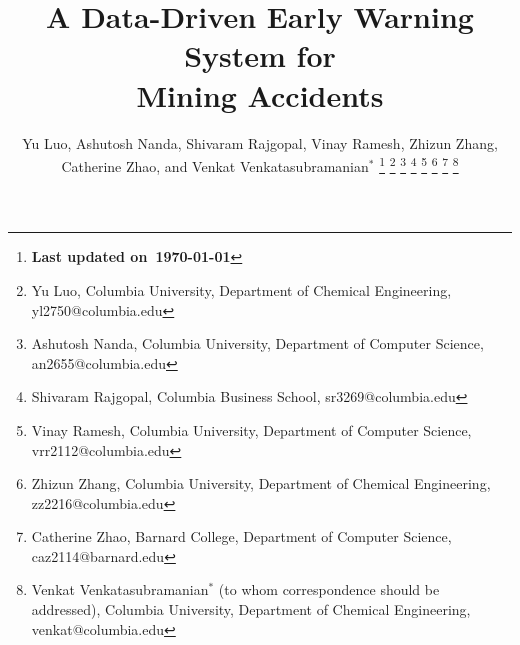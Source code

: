 \documentclass[journal]{IEEEtran}
\begin{document}
\title{\huge A Data-Driven Early Warning System for\\Mining Accidents}
\author{
  Yu Luo, Ashutosh Nanda, Shivaram Rajgopal, Vinay Ramesh, Zhizun Zhang, Catherine Zhao, and 
  Venkat Venkatasubramanian$^{\ast}$%
  \thanks{\bf Last updated on~\today{}}
  \thanks{Yu Luo, 
    Columbia University, Department of Chemical Engineering, yl2750@columbia.edu}
  \thanks{Ashutosh Nanda, 
    Columbia University, Department of Computer Science, an2655@columbia.edu}
  \thanks{Shivaram Rajgopal, 
    Columbia Business School, sr3269@columbia.edu}    
  \thanks{Vinay Ramesh, 
    Columbia University, Department of Computer Science, vrr2112@columbia.edu}    
  \thanks{Zhizun Zhang, 
    Columbia University, Department of Chemical Engineering, zz2216@columbia.edu}
  \thanks{Catherine Zhao, 
    Barnard College, Department of Computer Science, caz2114@barnard.edu}    
  \thanks{Venkat Venkatasubramanian$^{\ast}$
    (to whom correspondence should be addressed),
    Columbia University, Department of Chemical Engineering, venkat@columbia.edu}
}

\maketitle

\begin{abstract}
	
\end{abstract}

\IEEEpeerreviewmaketitle





\end{document}
